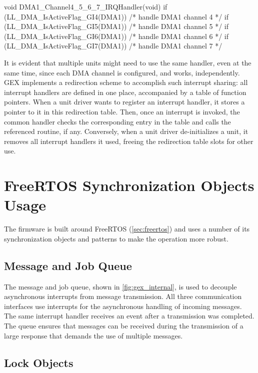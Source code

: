 \begin{ccode}
void DMA1_Channel4_5_6_7_IRQHandler(void)
{
    if (LL_DMA_IsActiveFlag_GI4(DMA1)) { /* handle DMA1 channel 4 */ }
    if (LL_DMA_IsActiveFlag_GI5(DMA1)) { /* handle DMA1 channel 5 */ }
    if (LL_DMA_IsActiveFlag_GI6(DMA1)) { /* handle DMA1 channel 6 */ }
    if (LL_DMA_IsActiveFlag_GI7(DMA1)) { /* handle DMA1 channel 7 */ }
}
\end{ccode}

It is evident that multiple units might need to use the same handler, even at the same time, since each \gls{DMA} channel is configured, and works, independently. GEX implements a redirection scheme to accomplish such interrupt sharing: all interrupt handlers are defined in one place, accompanied by a table of function pointers. When a unit driver wants to register an interrupt handler, it stores a pointer to it in this redirection table. Then, once an interrupt is invoked, the common handler checks the corresponding entry in the table and calls the referenced routine, if any. Conversely, when a unit driver de-initializes a unit, it removes all interrupt handlers it used, freeing the redirection table slots for other use.

\section{FreeRTOS Synchronization Objects Usage} \label{sec:rtos_in_gex}

The firmware is built around FreeRTOS (\cref{sec:freertos}) and uses a number of its synchronization objects and patterns to make the operation more robust.

\subsection{Message and Job Queue}

The message and job queue, shown in \cref{fig:gex_internal}, is used to decouple asynchronous interrupts from message transmission. All three communication interfaces use interrupts for the asynchronous handling of incoming messages. The same interrupt handler receives an event after a transmission was completed. The queue ensures that messages can be received during the transmission of a large response that demands the use of multiple messages.

\subsection{Lock Objects}

